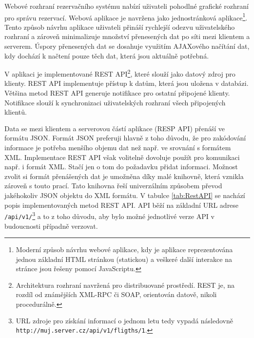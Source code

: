 \documentclass[ing,male,java,dept460]{diploma}						%
\begin{document}
Webové rozhraní rezervačního systému nabízí uživateli pohodlné grafické rozhraní pro správu rezervací. Webová aplikace je navržena jako jednostránková aplikace\footnote{Moderní způsob návrhu webové aplikace, kdy je aplikace reprezentována jednou základní HTML stránkou (statickou) a veškeré další interakce na stránce jsou řešeny pomocí JavaScriptu.}. Tento způsob návrhu aplikace uživateli přináší rychlejší odezvu uživatelského rozhraní a zároveň minimalizuje množství přenesených dat po síti mezi klientem a serverem. Úspory přenesených dat se dosahuje využitím AJAXového načítání dat, kdy dochází k načtení pouze těch dat, která jsou aktuálně potřebná.

V aplikaci je implementované REST API\footnote{Architektura rozhraní navržená pro distribuované prostředí. REST je, na rozdíl od známějších XML-RPC či SOAP, orientován datově, nikoli procedurálně.}, které slouží jako datový zdroj pro klienty. REST API implementuje přístup k datům, která jsou uložena v databázi. Většina metod REST API generuje notifikace pro ostatní připojené klienty. Notifikace slouží k synchronizaci uživatelských rozhraní všech připojených klientů.

Data se mezi klientem a serverovou částí aplikace (RESP API) přenáší ve formátu JSON. Formát JSON preferuji hlavně z toho důvodu, že pro zakódování informace je potřeba menšího objemu dat než např. ve srovnání s formátem XML. Implementace REST API však volitelně dovoluje použít pro komunikaci např. i formát XML. Stačí jen o tom do požadavku přidat informaci. Možnost zvolit si formát přenášených dat je umožněna díky malé knihovně, která vznikla zároveň s touto prací. Tato knihovna řeší univerzálním způsobem převod jakéhokoliv JSON objektu do XML formátu. V tabulce \ref{tab:RestAPI} se nachází popis implementovaných metod REST API. API běží na základní URL adrese \texttt{/api/v1/}\footnote{URL zdroje pro získání informací o jednom letu tedy vypadá následovně \texttt{http://muj.server.cz/api/v1/fligths/1}.} a to z toho důvodu, aby bylo možné jednotlivé verze API v budoucnosti případně verzovat.
\end{document}
